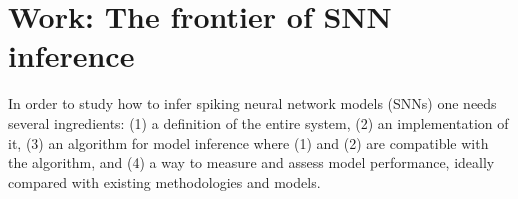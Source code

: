 \documentclass[mphil,deptreport,ai]{infthesis} %
\begin{document}






\chapter{Work: The frontier of SNN inference}

In order to study how to infer spiking neural network models (SNNs) one needs several ingredients: (1) a definition of the entire system, (2) an implementation of it, (3) an algorithm for model inference where (1) and (2) are compatible with the algorithm, and (4) a way to measure and assess model performance, ideally compared with existing methodologies and models.
\end{document}
